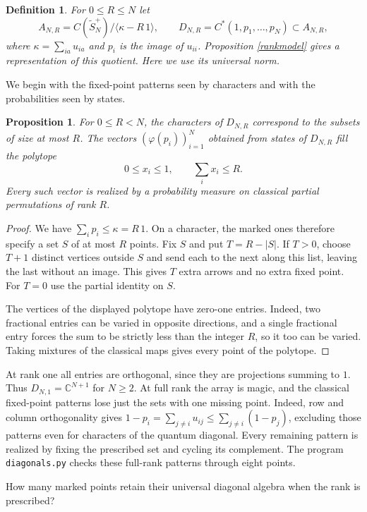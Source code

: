 \documentclass[11pt,a4paper]{article}
\newtheorem{prop}[thm]{Proposition}
\newtheorem{defn}[thm]{Definition}
\begin{document}
\begin{defn}
For $0\leq R\leq N$ let
\[
 A_{N,R}=C(\widetilde S_N^+)/\langle\kappa-R\,1\rangle,\qquad
 D_{N,R}=C^*(1,p_1,\ldots,p_N)\subset A_{N,R},
\]
where $\kappa=\sum_{ia}u_{ia}$ and $p_i$ is the image of $u_{ii}$. Proposition \ref{rankmodel} gives a representation of this quotient. Here we use its universal norm.
\end{defn}

We begin with the fixed-point patterns seen by characters and with the probabilities seen by states.

\begin{prop}\label{rankpatterns}
For $0\leq R<N$, the characters of $D_{N,R}$ correspond to the subsets of size at most $R$. The vectors $(\varphi(p_i))_{i=1}^N$ obtained from states of $D_{N,R}$ fill the polytope
\[
 0\leq x_i\leq 1,\qquad \sum_i x_i\leq R.
\]
Every such vector is realized by a probability measure on classical partial permutations of rank $R$.
\end{prop}
\begin{proof}
We have $\sum_i p_i\leq\kappa=R\,1$. On a character, the marked ones therefore specify a set $S$ of at most $R$ points. Fix $S$ and put $T=R-|S|$. If $T>0$, choose $T+1$ distinct vertices outside $S$ and send each to the next along this list, leaving the last without an image. This gives $T$ extra arrows and no extra fixed point. For $T=0$ use the partial identity on $S$.

The vertices of the displayed polytope have zero-one entries. Indeed, two fractional entries can be varied in opposite directions, and a single fractional entry forces the sum to be strictly less than the integer $R$, so it too can be varied. Taking mixtures of the classical maps gives every point of the polytope.
\end{proof}

At rank one all entries are orthogonal, since they are projections summing to $1$. Thus $D_{N,1}=\mathbb C^{N+1}$ for $N\geq2$. At full rank the array is magic, and the classical fixed-point patterns lose just the sets with one missing point. Indeed, row and column orthogonality gives $1-p_i=\sum_{j\ne i}u_{ij}\leq\sum_{j\ne i}(1-p_j)$, excluding those patterns even for characters of the quantum diagonal. Every remaining pattern is realized by fixing the prescribed set and cycling its complement. The program \texttt{diagonals.py} checks these full-rank patterns through eight points.

How many marked points retain their universal diagonal algebra when the rank is prescribed?
\end{document}
